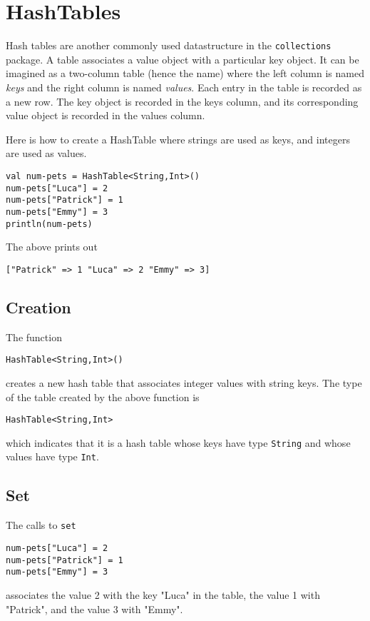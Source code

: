 \documentclass[10pt,oneside]{book}
\begin{document}
\section{HashTables}
Hash tables are another commonly used datastructure in the \texttt{\frenchspacing collections} package. A table associates a value object with a particular key object. It can be imagined as a two-column table (hence the name) where the left column is named {\em keys} and the right column is named {\em values}. Each entry in the table is recorded as a new row. The key object is recorded in the keys column, and its corresponding value object is recorded in the values column.

Here is how to create a HashTable where strings are used as keys, and integers are used as values.
\begin{lstlisting}
val num-pets = HashTable<String,Int>()
num-pets["Luca"] = 2
num-pets["Patrick"] = 1
num-pets["Emmy"] = 3
println(num-pets)
\end{lstlisting}
The above prints out
\begin{lstlisting}
["Patrick" => 1 "Luca" => 2 "Emmy" => 3]
\end{lstlisting}

\subsection*{Creation}
The function
\begin{lstlisting}
HashTable<String,Int>()
\end{lstlisting}
creates a new hash table that associates integer values with string keys. The type of the table created by the above function is
\begin{lstlisting}
HashTable<String,Int>
\end{lstlisting}
which indicates that it is a hash table whose keys have type \texttt{\frenchspacing String} and whose values have type \texttt{\frenchspacing Int}.

\subsection*{Set}
The calls to \texttt{\frenchspacing set}
\begin{lstlisting}
num-pets["Luca"] = 2
num-pets["Patrick"] = 1
num-pets["Emmy"] = 3
\end{lstlisting}
associates the value 2 with the key "Luca" in the table, the value 1 with "Patrick", and the value 3 with "Emmy". 
\end{document}
